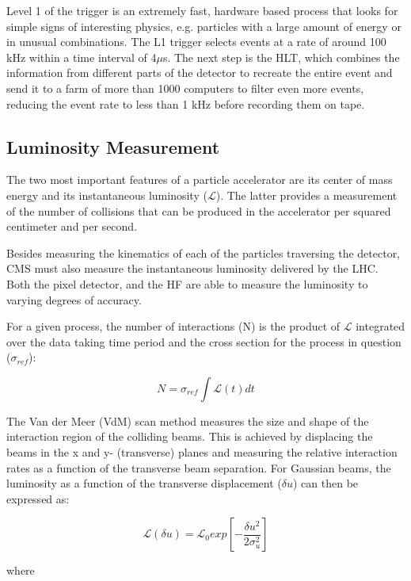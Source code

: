 Level 1 of the trigger is an extremely fast, hardware based process that looks for simple signs of interesting physics, e.g. particles with a large amount of energy or in unusual combinations. The L1 trigger selects events at a rate of around 100 kHz within a time interval of 4$\mu$s. The next step is the HLT, which combines the information from different parts of the detector to recreate the entire event and send it to a farm of more than 1000 computers to filter even more events, reducing the event rate to less than 1 kHz before recording them on tape.

\subsection{Luminosity Measurement}

The two most important features of a particle accelerator are its center of mass energy and its instantaneous luminosity ($\mathcal{L}$). The latter provides a measurement of the number of collisions that can be produced in the accelerator per squared centimeter and per second.

Besides measuring the kinematics of each of the particles traversing the detector, CMS must also measure the instantaneous luminosity delivered by the LHC. Both the pixel detector, and the HF are able to measure the luminosity to varying degrees of accuracy.

For a given process, the number of interactions (N) is the product of $\mathcal{L}$ integrated over the data taking time period and the cross section for the process in question ($\sigma_{ref}$):

\begin{equation}
N = \sigma_{ref}\int\mathcal{L}(t)dt
\end{equation} 


The Van der Meer (VdM) scan method measures the size and shape of the interaction region of the colliding beams. This is achieved by displacing the beams in the x and y- (transverse) planes and measuring the relative interaction rates as a function of the transverse beam separation. For Gaussian beams, the luminosity as a function of the transverse displacement ($\delta u$) can then be expressed as:  

\begin{equation}
\mathcal{L}(\delta u) = \mathcal{L}_{0} exp[-\frac{\delta u^{2}}{2\sigma_{u}^{2}}]
\end{equation}

where 

